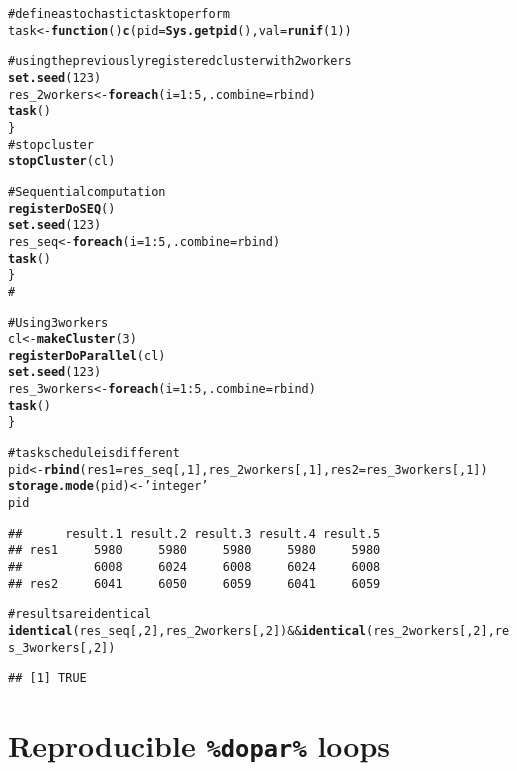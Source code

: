 \documentclass[a4paper,12pt]{article}\usepackage{graphicx, color}
\makeatletter
\newcommand{\hlfunctioncall}[1]{\textcolor[rgb]{0.501960784313725,0,0.329411764705882}{\textbf{#1}}}%
\newcommand{\hlstring}[1]{\textcolor[rgb]{0.6,0.6,1}{#1}}%
\newcommand{\hlcomment}[1]{\textcolor[rgb]{0.180392156862745,0.6,0.341176470588235}{#1}}%
\newenvironment{kframe}{%
 \def\at@end@of@kframe{}%
 \ifinner\ifhmode%
  \def\at@end@of@kframe{\end{minipage}}%
  \begin{minipage}{\columnwidth}%
 \fi\fi%
 \def\FrameCommand##1{\hskip\@totalleftmargin \hskip-\fboxsep
 \colorbox{shadecolor}{##1}\hskip-\fboxsep
     \hskip-\linewidth \hskip-\@totalleftmargin \hskip\columnwidth}%
 \MakeFramed {\advance\hsize-\width
   \@totalleftmargin\z@ \linewidth\hsize
   \@setminipage}}%
 {\par\unskip\endMakeFramed%
 \at@end@of@kframe}
\newenvironment{knitrout}{}{} %
\renewenvironment{knitrout}{\begin{footnotesize}}{\end{footnotesize}}
\makeatother
\begin{document}
\begin{knitrout}
\color{fgcolor}\begin{kframe}
\begin{alltt}

\hlcomment{# define a stochastic task to perform}
task <- \hlfunctioncall{function}() \hlfunctioncall{c}(pid=\hlfunctioncall{Sys.getpid}(), val=\hlfunctioncall{runif}(1))

\hlcomment{# using the previously registered cluster with 2 workers}
\hlfunctioncall{set.seed}(123)
res_2workers <- \hlfunctioncall{foreach}(i=1:5, .combine=rbind) %dorng% \{
	\hlfunctioncall{task}()
\}
\hlcomment{# stop cluster}
\hlfunctioncall{stopCluster}(cl)

\hlcomment{# Sequential computation}
\hlfunctioncall{registerDoSEQ}()
\hlfunctioncall{set.seed}(123)
res_seq <- \hlfunctioncall{foreach}(i=1:5, .combine=rbind) %dorng% \{
	\hlfunctioncall{task}() 
\}
\hlcomment{#}

\hlcomment{# Using 3 workers}
cl <- \hlfunctioncall{makeCluster}(3)
\hlfunctioncall{registerDoParallel}(cl)
\hlfunctioncall{set.seed}(123)
res_3workers <- \hlfunctioncall{foreach}(i=1:5, .combine=rbind) %dorng% \{ 
	\hlfunctioncall{task}()
\}

\hlcomment{# task schedule is different}
pid <- \hlfunctioncall{rbind}(res1=res_seq[,1], res_2workers[,1], res2=res_3workers[,1])
\hlfunctioncall{storage.mode}(pid) <- \hlstring{'integer'}
pid
\end{alltt}
\begin{verbatim}
##      result.1 result.2 result.3 result.4 result.5
## res1     5980     5980     5980     5980     5980
##          6008     6024     6008     6024     6008
## res2     6041     6050     6059     6041     6059
\end{verbatim}
\begin{alltt}
\hlcomment{# results are identical}
\hlfunctioncall{identical}(res_seq[,2], res_2workers[,2]) && \hlfunctioncall{identical}(res_2workers[,2], res_3workers[,2])
\end{alltt}
\begin{verbatim}
## [1] TRUE
\end{verbatim}
\end{kframe}
\end{knitrout}


\section{Reproducible \texttt{\%dopar\%} loops}
\end{document}
